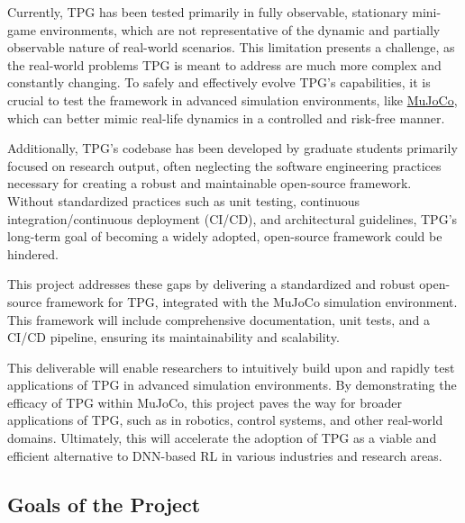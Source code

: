 \documentclass[12pt]{article}
\begin{document}
Currently, TPG has been tested primarily in fully observable, stationary mini-game environments, which are not representative of the dynamic and partially observable nature of real-world scenarios. This limitation presents a challenge, as the real-world problems TPG is meant to address are much more complex and constantly changing. To safely and effectively evolve TPG's capabilities, it is crucial to test the framework in advanced simulation environments, like \href{https://github.com/google-deepmind/mujoco}{MuJoCo}, which can better mimic real-life dynamics in a controlled and risk-free manner.

Additionally, TPG's codebase has been developed by graduate students primarily focused on research output, often neglecting the software engineering practices necessary for creating a robust and maintainable open-source framework. Without standardized practices such as unit testing, continuous integration/continuous deployment (CI/CD), and architectural guidelines, TPG's long-term goal of becoming a widely adopted, open-source framework could be hindered. 

This project addresses these gaps by delivering a standardized and robust open-source framework for TPG, integrated with the MuJoCo simulation environment. This framework will include comprehensive documentation, unit tests, and a CI/CD pipeline, ensuring its maintainability and scalability.

This deliverable will enable researchers to intuitively build upon and rapidly test applications of TPG in advanced simulation environments. By demonstrating the efficacy of TPG within MuJoCo, this project paves the way for broader applications of TPG, such as in robotics, control systems, and other real-world domains. Ultimately, this will accelerate the adoption of TPG as a viable and efficient alternative to DNN-based RL in various industries and research areas.
\subsection{Goals of the Project}
\end{document}
